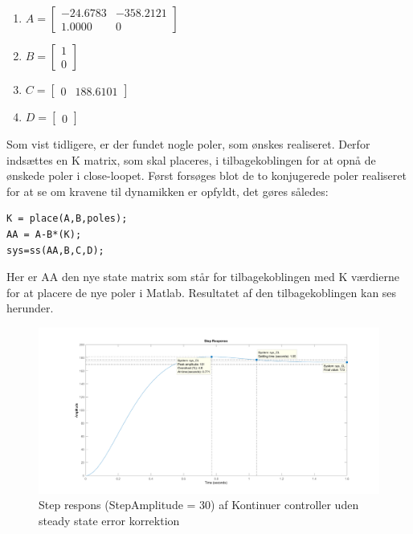 \begin{enumerate}
	
	\item
	$
	A = 
	\begin{bmatrix}
	
	-24.6783 &-358.2121\\
	1.0000      &   0
	\end{bmatrix}
	$
	\item
	$
	B = 
	\begin{bmatrix}
	
	1\\
	0
	\end{bmatrix}
	$    
	
	\item 
	$
	C = 
	\begin{bmatrix}
	
	0  & 188.6101
	\end{bmatrix}
	$    
	\item
	$
	D = 
	\begin{bmatrix}
	
	0  
	\end{bmatrix}
	$  
\end{enumerate}      
Som vist tidligere, er der fundet nogle poler, som ønskes realiseret. Derfor indsættes en K matrix, som skal placeres, i tilbagekoblingen for at opnå de ønskede poler i close-loopet. Først forsøges blot de to konjugerede poler realiseret for at se om kravene til dynamikken er opfyldt, det gøres således:

\begin{lstlisting}[frame=single]
K = place(A,B,poles);
AA = A-B*(K);
sys=ss(AA,B,C,D);
\end{lstlisting}
Her er AA den nye state matrix som står for tilbagekoblingen med K værdierne for at placere de nye poler i Matlab. Resultatet af den tilbagekoblingen kan ses herunder. 

\begin{figure}[H]
	\centering
	\includegraphics[width = 1\textwidth]{figur/Step_continues_1}
	\caption{Step respons (StepAmplitude = 30) af Kontinuer controller uden steady state error korrektion}
	\label{fig:Kontinuer controller 1}
\end{figure}


